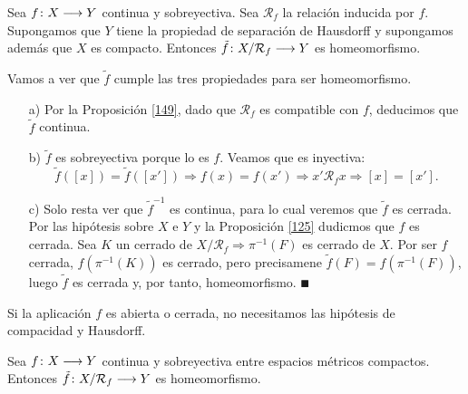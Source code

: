 \documentclass[GTS.tex]{subfiles}
\begin{document}
\begin{prop}
Sea $f\colon{X}\longrightarrow{Y}$ continua y sobreyectiva. Sea $\mathcal{R}_f$ la relación inducida por $f$. Supongamos que $Y$ tiene la propiedad de separación de Hausdorff y supongamos además que $X$ es compacto. Entonces $\tilde{f}\colon{X/\mathcal{R}_f}\longrightarrow{Y}$ es homeomorfismo.
\end{prop}
\begin{dem}
Vamos a ver que $\tilde{f}$ cumple las tres propiedades para ser homeomorfismo.
\begin{enumerate}
\item[a)] Por la Proposición \ref{149}, dado que $\mathcal{R}_f$ es compatible con $f$, deducimos que $\tilde{f}$ continua.
\item[b)] $\tilde{f}$ es sobreyectiva porque lo es $f$. Veamos que es inyectiva:
\begin{equation*}
\tilde{f}([x])=\tilde{f}([x'])\Rightarrow f(x)=f(x')\Rightarrow x'\mathcal{R}_f x\Rightarrow [x]=[x'].
\end{equation*}
\item[c)] Solo resta ver que $\tilde{f}^{-1}$ es continua, para lo cual veremos que $\tilde{f}$ es cerrada. Por las hipótesis sobre $X$ e $Y$ y la Proposición \ref{125} dudicmos que $f$ es cerrada. Sea $K$ un cerrado de $X/\mathcal{R}_f\Rightarrow\pi^{-1}(F)$ es cerrado de $X$. Por ser $f$ cerrada, $f(\pi^{-1}(K))$ es cerrado, pero precisamene $\tilde{f}(F)=f(\pi^{-1}(F))$, luego $\tilde{f}$ es cerrada y, por tanto, homeomorfismo. 
{$\QED$}
\end{enumerate}

\end{dem}
\begin{nota}
Si la aplicación $f$ es abierta o cerrada, no necesitamos las hipótesis de compacidad y Hausdorff.
\end{nota}
\begin{coro} Sea $f\colon{X}\longrightarrow{Y}$ continua y sobreyectiva entre espacios métricos compactos. Entonces $\tilde{f}\colon{X/\mathcal{R}_f}\longrightarrow{Y}$ es homeomorfismo.
\end{coro}
\end{document}
